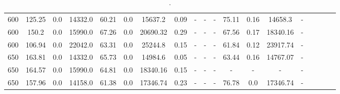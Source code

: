 \begin{sidewaystable}[!h]
\begin{tabular}{lcccccccccccccccccc}
600 & 125.25 & 0.0 & 14332.0 & 60.21 & 0.0 & 15637.2 & 0.09 & - & - & - & 75.11 & 0.16 & 14658.3 &  - \\
600 & 150.2 & 0.0 & 15990.0 & 67.26 & 0.0 & 20690.32 & 0.29 & - & - & - & 67.56 & 0.17 & 18340.16 &  - \\
600 & 106.94 & 0.0 & 22042.0 & 63.31 & 0.0 & 25244.8 & 0.15 & - & - & - & 61.84 & 0.12 & 23917.74 &  - \\
650 & 163.81 & 0.0 & 14332.0 & 65.73 & 0.0 & 14984.6 & 0.05 & - & - & - & 63.44 & 0.16 & 14767.07 &  - \\
650 & 164.57 & 0.0 & 15990.0 & 64.81 & 0.0 & 18340.16 & 0.15 & - & - & - & - & - & - & - \\
650 & 157.96 & 0.0 & 14158.0 & 61.38 & 0.0 & 17346.74 & 0.23 & - & - & - & 76.78 & 0.0 & 17346.74 &  - \\
\bottomrule
\end{tabular}
\caption{.}
\label{tab:}
\end{sidewaystable}
